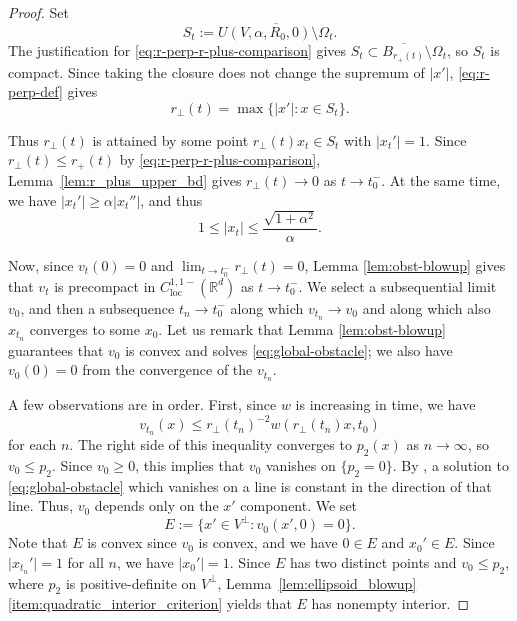 \documentclass[11pt]{amsart}
\numberwithin{equation}{section}
\numberwithin{figure}{section}
\theoremstyle{plain}
\theoremstyle{definition}
\theoremstyle{remark}
\theoremstyle{plain}
\newcommand{\abs}[1]{\lvert #1 \rvert}
\def\R{\mathbb{R}}
\begin{document}
\begin{proof}

Set
\[
    S_t:=\overline{U(V,\alpha,R_0,0)\setminus\Omega_t}.
\]
The justification for \eqref{eq:r-perp-r-plus-comparison} gives
$S_t\subset\overline{B_{r_+(t)}}\setminus\Omega_t$, so $S_t$ is compact.
Since taking the closure does not change the supremum of $|x'|$,
\eqref{eq:r-perp-def} gives
\begin{equation}\label{eq:r-perp-attainment}
    r_\perp(t)=\max\{|x'|:x\in S_t\}.
\end{equation}

Thus $r_\perp(t)$ is attained by some point
$r_\perp(t)x_t\in S_t$ with $|x_t'|=1$.
Since $r_\perp(t)\leq r_+(t)$ by \eqref{eq:r-perp-r-plus-comparison},
Lemma~\ref{lem:r_plus_upper_bd} gives $r_\perp(t)\to0$ as $t\to t_0^-$.
At the same time, we have $|x_t'|\geq\alpha|x_t''|$, and thus
\[
    1\leq|x_t|\leq\frac{\sqrt{1+\alpha^2}}{\alpha}.
\]

Now, since $v_t(0) = 0$ and $\lim_{t\to t_0^{-}}r_\perp(t) = 0$, Lemma \ref{lem:obst-blowup} gives that $v_t$ is precompact in $C^{1,1-}_{\mathrm{loc}}(\R^d)$ as $t\to t_0^-$. We select a subsequential limit $v_0$, and then a subsequence $t_n\to t_0^-$ along which $v_{t_n}\to v_0$ and along which also $x_{t_n}$ converges to some $x_0$. Let us remark that Lemma \ref{lem:obst-blowup} guarantees that $v_0$ is convex and solves \eqref{eq:global-obstacle}; we also have $v_0(0) = 0$ from the convergence of the $v_{t_n}$.





A few observations are in order. First, since $w$ is increasing in time, we have
\[
    v_{t_n}(x)\leq
    r_\perp(t_n)^{-2}w(r_\perp(t_n)x,t_0)
\]
for each $n$.
The right side of this inequality converges to $p_2(x)$ as $n\to\infty$,
so $v_0\leq p_2$.
Since $v_0\geq 0$, this implies that $v_0$ vanishes on $\{p_2 = 0\}$. By \cite[Lem.~2.7]{EFW25}, a solution to \eqref{eq:global-obstacle} which vanishes on a line is constant in the direction of that line. Thus, $v_0$ depends only on the $x'$ component. We set
\[ E := \{ x'\in V^\perp : v_0(x',0) = 0\}.\]
Note that $E$ is convex since $v_0$ is convex, and we have $0\in E$ and $x_0'\in E$. Since $\abs{x_{t_n}'}=1$ for all $n$, we
have $|x_0'|=1$.
Since $E$ has two distinct points and $v_0 \leq p_2$, where $p_2$ is positive-definite on $V^\perp$, Lemma~\ref{lem:ellipsoid_blowup}\ref{item:quadratic_interior_criterion} yields that $E$ has nonempty interior.


\end{proof}
\end{document}
